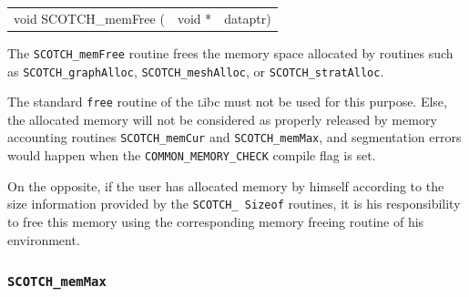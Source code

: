 \begin{itemize}
\progsyn

{\tt\begin{tabular}{l@{}ll}
void SCOTCH\_memFree ( & void * & dataptr)
\end{tabular}}

\progdes

The {\tt SCOTCH\_memFree} routine frees the memory space allocated
by routines such as {\tt SCOTCH\_\lbt graph\lbt Alloc},
{\tt SCOTCH\_\lbt mesh\lbt Alloc}, or
{\tt SCOTCH\_\lbt strat\lbt Alloc}.

The standard {\tt free} routine of the {\textsc libc} must not be
used for this purpose. Else, the allocated memory will not be
considered as properly released by memory accounting routines
{\tt SCOTCH\_\lbt mem\lbt Cur} and {\tt SCOTCH\_\lbt mem\lbt Max},
and segmentation errors would happen when the
{\tt COMMON\_\lbt MEMORY\_\lbt CHECK} compile flag is set.

On the opposite, if the user has allocated memory by himself according
to the size information provided by the {\tt SCOTCH\_\lbt *\lbt
Sizeof} routines, it is his responsibility to free this memory using
the corresponding memory freeing routine of his environment.
\end{itemize}

\subsubsection{{\tt SCOTCH\_memMax}}

